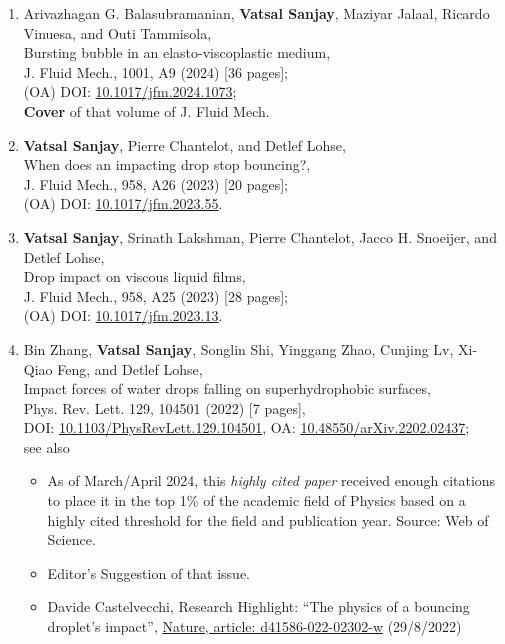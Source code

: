 \documentclass[10pt,a4paper,colorlinks,linkcolor=blue,urlcolor=blue,citecolor=blue]{moderncv}
\begin{document}
\begin{enumerate}[leftmargin=1.25em]
	\item Arivazhagan G. Balasubramanian, \textbf{Vatsal Sanjay}, Maziyar Jalaal, Ricardo Vinuesa, and Outi Tammisola,\\
	Bursting bubble in an elasto-viscoplastic medium,\\
	J. Fluid Mech., 1001, A9 (2024) [36 pages];\\
	(OA) DOI: \href{https://doi.org/10.1017/jfm.2024.1073}{10.1017/jfm.2024.1073};\\
	\textbf{Cover} of that volume of J. Fluid Mech.

	\item \textbf{Vatsal Sanjay}, Pierre Chantelot, and Detlef Lohse,\\
	When does an impacting drop stop bouncing?,\\
	J. Fluid Mech., 958, A26 (2023) [20 pages];\\
	(OA) DOI: \href{https://doi.org/10.1017/jfm.2023.55}{10.1017/jfm.2023.55}.

	\item \textbf{Vatsal Sanjay}, Srinath Lakshman, Pierre Chantelot, Jacco H. Snoeijer, and Detlef Lohse,\\
	Drop impact on viscous liquid films,\\
	J. Fluid Mech., 958, A25 (2023) [28 pages];\\
	(OA) DOI: \href{https://doi.org/10.1017/jfm.2023.13}{10.1017/jfm.2023.13}.

	\item Bin Zhang, \textbf{Vatsal Sanjay}, Songlin Shi,  Yinggang Zhao,  Cunjing Lv,  Xi-Qiao Feng,  and Detlef Lohse,\\
	Impact forces of water drops falling on superhydrophobic surfaces,\\
	Phys. Rev. Lett. 129, 104501 (2022) [7 pages],\\
	DOI: \href{https://doi.org/10.1103/PhysRevLett.129.104501}{10.1103/PhysRevLett.129.104501}, OA:  \href{https://doi.org/10.48550/arXiv.2202.02437}{10.48550/arXiv.2202.02437};\\
	see also
	\begin{itemize}
		\item
		As of March/April 2024, this \textit{highly cited paper} received enough citations to place it in the top 1\% of the academic field of Physics based on a highly cited threshold for the field and publication year. Source: Web of Science.
		\item
		Editor's Suggestion of that issue.
		\item
		Davide Castelvecchi, Research Highlight: ``The physics of a bouncing droplet's impact'', \href{https://www.nature.com/articles/d41586-022-02302-w}{Nature, article: d41586-022-02302-w} (29/8/2022)
	\end{itemize}


\end{enumerate}
\end{document}
